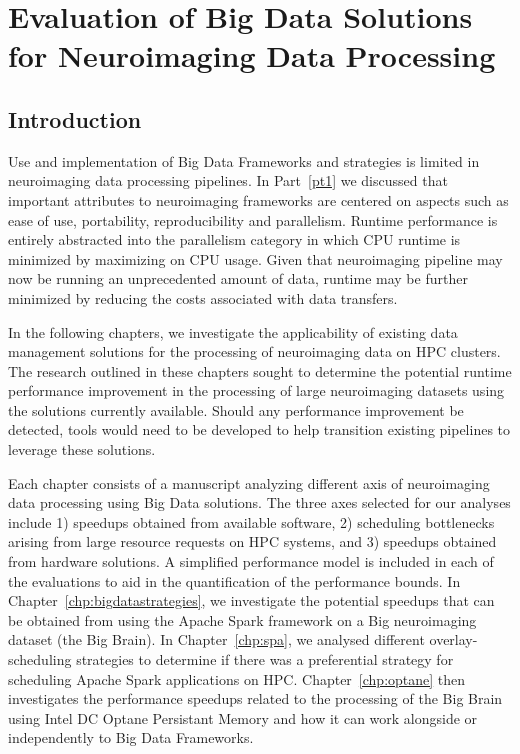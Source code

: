\part{Evaluation of Big Data Solutions for Neuroimaging Data Processing}
\chapter{Introduction}

Use and implementation of Big Data Frameworks and strategies is limited in
neuroimaging data processing pipelines. In Part~\ref{pt1} we discussed
that important attributes to neuroimaging frameworks are centered on aspects
such as ease of use, portability, reproducibility and parallelism. Runtime performance
is entirely abstracted into the parallelism category in which CPU runtime is minimized
by maximizing on CPU usage. Given that neuroimaging pipeline may now be running an unprecedented
amount of data, runtime may be further minimized by reducing the costs associated with data
transfers.

In the following chapters, we investigate the applicability of existing data management
solutions for the processing of neuroimaging data on HPC clusters. The research outlined
in these chapters sought to determine the potential runtime performance
improvement in the processing of large neuroimaging datasets using the solutions currently
available. Should any performance improvement be detected, tools would need to be developed
to help transition existing pipelines to leverage these solutions.

Each chapter consists of a manuscript analyzing different axis of neuroimaging data processing
using Big Data solutions. The three axes selected for our analyses include 1) speedups obtained
from available software, 2) scheduling bottlenecks arising from large resource requests on HPC systems, and
3) speedups obtained from hardware solutions. A simplified performance model is included in 
each of the evaluations to aid in the quantification of the performance bounds.
In Chapter~\ref{chp:bigdatastrategies},
we investigate the potential speedups that can be obtained from using the Apache Spark
framework on a Big neuroimaging dataset (the Big Brain). In Chapter~\ref{chp:spa}, 
we analysed different overlay-scheduling strategies to determine if there was a 
preferential strategy for scheduling Apache Spark applications on HPC. Chapter~\ref{chp:optane}
then investigates the performance speedups related to the processing of the Big Brain using
Intel DC Optane Persistant Memory and how it can work alongside or independently to Big Data
Frameworks.  